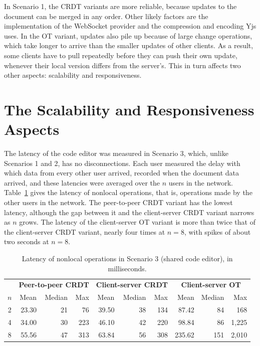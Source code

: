 In Scenario 1, the CRDT variants are more reliable, because updates to the document can be merged in any order. Other likely factors are the implementation of the WebSocket provider and the compression and encoding Yjs uses. In the OT variant, updates also pile up because of large change operations, which take longer to arrive than the smaller updates of other clients. As a result, some clients have to pull repeatedly before they can push their own update, whenever their local version differs from the server's. This in turn affects two other aspects: scalability and responsiveness.

\section{The Scalability and Responsiveness Aspects}
\label{sec:5:latency}

The latency of the code editor was measured in Scenario 3, which, unlike Scenarios 1 and 2, has no disconnections. Each user measured the delay with which data from every other user arrived, recorded when the document data arrived, and these latencies were averaged over the $n$ users in the network. Table~\ref{tab:latency-3} gives the latency of nonlocal operations, that is, operations made by the other users in the network. The peer-to-peer CRDT variant has the lowest latency, although the gap between it and the client-server CRDT variant narrows as $n$ grows. The latency of the client-server OT variant is more than twice that of the client-server CRDT variant, nearly four times at $n = 8$, with spikes of about two seconds at $n = 8$.

\begin{table}[htbp]
 \centering
 \caption{Latency of nonlocal operations in Scenario 3 (shared code editor), in milliseconds.}
 \label{tab:latency-3}
 \begin{tabular}{@{}c rrr rrr rrr@{}}
 \toprule
 & \multicolumn{3}{c}{\textbf{Peer-to-peer CRDT}} & \multicolumn{3}{c}{\textbf{Client-server CRDT}} & \multicolumn{3}{c}{\textbf{Client-server OT}} \\
 \cmidrule(lr){2-4}\cmidrule(lr){5-7}\cmidrule(l){8-10}
 $n$ & Mean & Median & Max & Mean & Median & Max & Mean & Median & Max \\
 \midrule
 2 & 23.30 & 21 & 76  & 39.50 & 38 & 134 & 87.42  & 84  & 168 \\
 4 & 34.00 & 30 & 223 & 46.10 & 42 & 220 & 98.84  & 86  & 1{,}225 \\
 8 & 55.56 & 47 & 313 & 63.84 & 56 & 308 & 235.62 & 151 & 2{,}010 \\
 \bottomrule
 \end{tabular}
\end{table}

